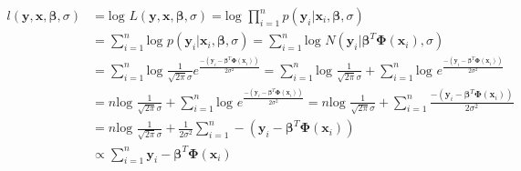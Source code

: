 \documentclass[a4paper,10pt]{article}
\begin{document}
\begin{equation}
 \begin{split}
  l(\bm{y}, \bm{x},\bm{\beta},\sigma) & = \text{log } L(\bm{y}, \bm{x},\bm{\beta},\sigma) = \text{log } \prod_{i=1}^{n} p(\bm{y}_i | \bm{x}_i, \bm{\beta}, \sigma)\\
  & =  \sum_{i=1}^{n}  \text{log } p(\bm{y}_i | \bm{x}_i, \bm{\beta}, \sigma) = \sum_{i=1}^{n} \text{log } N(\bm{y}_i | \bm{\beta}^T \bm{\Phi}(\bm{x}_i), \sigma)  \\
  & =  \sum_{i=1}^{n} \text{log }  \frac{1}{\sqrt{2\pi}\sigma} e^{\frac{-(\bm{y}_i - \bm{\beta}^T\bm{\Phi}(\bm{x}_i))}{2\sigma^2} } = \sum_{i=1}^{n} \text{log } \frac{1}{\sqrt{2\pi}\sigma} + \sum_{i=1}^{n} \text{log } e^{\frac{-(\bm{y}_i - \bm{\beta}^T\bm{\Phi}(\bm{x}_i))}{2\sigma^2} } \\
  & = n \text{log } \frac{1}{\sqrt{2\pi}\sigma} + \sum_{i=1}^{n} \text{log } e^{\frac{-(\bm{y}_i - \bm{\beta}^T\bm{\Phi}(\bm{x}_i))}{2\sigma^2} } = n \text{log } \frac{1}{\sqrt{2\pi}\sigma} + \sum_{i=1}^{n}  \frac{-(\bm{y}_i - \bm{\beta}^T\bm{\Phi}(\bm{x}_i))}{2\sigma^2} \\
  &  = n \text{log } \frac{1}{\sqrt{2\pi}\sigma} + \frac{1}{2\sigma^2} \sum_{i=1}^{n}  -(\bm{y}_i - \bm{\beta}^T\bm{\Phi}(\bm{x}_i)) \\
  & \propto  \sum_{i=1}^{n}  \bm{y}_i - \bm{\beta}^T\bm{\Phi}(\bm{x}_i)
 \end{split}
\end{equation}
\end{document}
